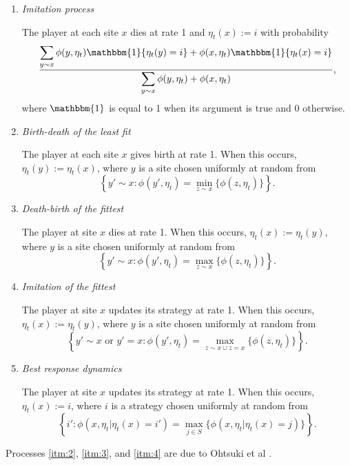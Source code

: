 \documentclass[notitlepage,reqno]{amsart}
\begin{document}
\begin{enumerate}[(1)]
\item \label{itm:4} \emph{Imitation process}

The player at each site $x$ dies at rate 1 and $\eta_t(x) := i$ with probability
\[
    \frac{\displaystyle\sum_{y\sim x} \phi(y,\eta_t)\mathbbm{1}\{\eta_t(y) = i\} + \phi(x,\eta_t)\mathbbm{1}\{\eta_t(x)=i\}}{\displaystyle\sum_{y\sim x}\phi(y,\eta_t) + \phi(x,\eta_t)},
\]
where $\mathbbm{1}$ is equal to 1 when its argument is true and 0
otherwise.

\item \label{itm:5} \emph{Birth-death of the least fit}

The player at each site $x$ gives birth at rate 1. When this occurs,
$\eta_t(y) := \eta_t(x)$, where $y$ is a site chosen uniformly at
random from 
\[
    \left\{ y'\sim x:\phi(y',\eta_t) = \min_{z\sim x}\{\phi(z,\eta_t)\}
    \right\}.
\]

\item \label{itm:6} \emph{Death-birth of the fittest}

The player at site $x$ dies at rate 1. When this occurs, $\eta_t(x) :=
\eta_t(y)$, where $y$ is a site chosen uniformly at random from
\[
    \left\{ y'\sim x:\phi(y',\eta_t) = \max_{z\sim x}\{\phi(z,\eta_t)\}
\right\}.
\]

\item \label{itm:7} \emph{Imitation of the fittest}

The player at site $x$ updates its strategy at rate 1. When this
occurs, $\eta_t(x) := \eta_t(y)$, where $y$ is a site chosen uniformly
at random from \[
    \left\{ y'\sim x \text{ or } y'=x:\phi(y',\eta_t) = \max_{z\sim x\cup
        z=x}\{\phi(z,\eta_t)\} \right\}.
\]

\item \label{itm:8} \emph{Best response dynamics}

The player at site $x$ updates its strategy at rate 1. When this
occurs, $\eta_t(x) := i$, where $i$ is a strategy chosen uniformly at random from 
\[
    \displaystyle\left\{ i':\phi(x,\eta_t | \eta_t(x) = i') = \max_{j\in S}\{\phi(x,\eta_t | \eta_t(x) = j)\} \right\}.
\]
\end{enumerate}

Processes \ref{itm:2}, \ref{itm:3}, and \ref{itm:4} are due to
Ohtsuki et al \cite{ohtsuki}.
\end{document}
